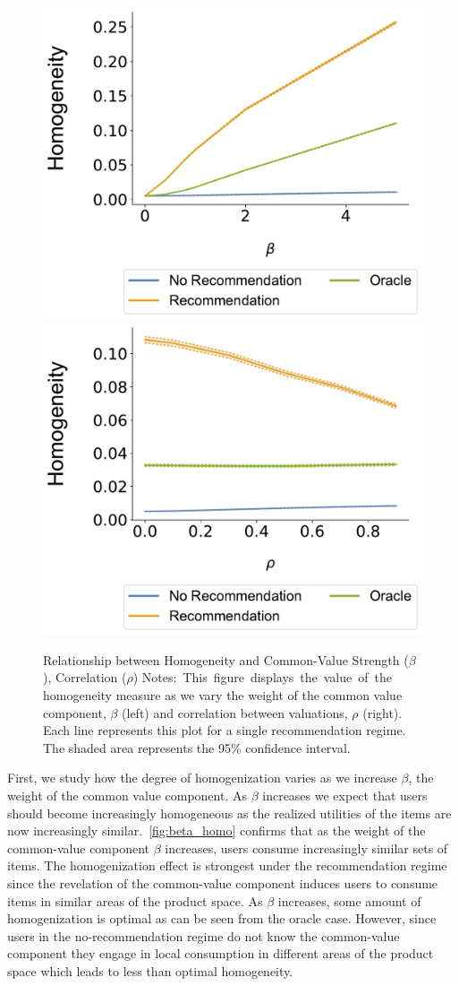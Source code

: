 \documentclass[sigconf]{acmart}
\begin{document}
\begin{figure}[t]
\centering
\includegraphics[width=.42\linewidth]{figures/beta_homogeneity_N_200_T_20} \hspace{20pt}
\includegraphics[width=.42\linewidth]{figures/rho_homogeneity_N_200_T_20}
\caption{Relationship between Homogeneity and Common-Value Strength ($\beta$), Correlation ($\rho$)\hfill\break
\scriptsize{Notes:~This~figure~displays~the~value~of~the homogeneity measure as we vary the weight of the common value component, $\beta$ (left) and correlation between valuations, $\rho$ (right). Each line represents this plot for a single recommendation regime. The shaded area represents the 95\% confidence interval.}}
\label{fig:beta_homo}\end{figure}

First, we study how the degree of homogenization varies as we increase $\beta$, the weight of the common value component. As $\beta$ increases we expect that users should become increasingly homogeneous as the realized utilities of the items are now increasingly similar.~\autoref{fig:beta_homo} confirms that as the weight of the common-value component $\beta$ increases, users consume increasingly similar sets of items. The homogenization effect is strongest under the recommendation regime since the revelation of the common-value component induces users to consume items in similar areas of the product space. As $\beta$ increases, some amount of homogenization is optimal as can be seen from the oracle case. However, since users in the no-recommendation regime do not know the common-value component they engage in local consumption in different areas of the product space which leads to less than optimal homogeneity.
\end{document}
